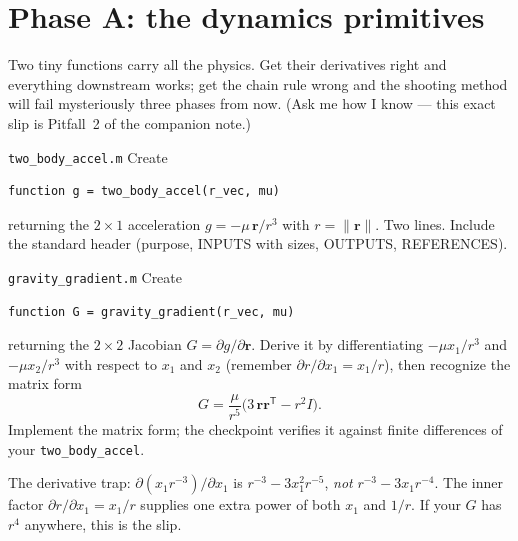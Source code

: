 \documentclass[11pt,letterpaper]{article}
\newcommand{\T}{^{\mathsf{T}}}
\newcommand{\rvec}{\mathbf{r}}
\begin{document}
\section{Phase A: the dynamics primitives}

Two tiny functions carry all the physics. Get their derivatives right and
everything downstream works; get the chain rule wrong and the shooting method
will fail mysteriously three phases from now. (Ask me how I know --- this
exact slip is Pitfall~2 of the companion note.)

\begin{exercise}{\texttt{two\_body\_accel.m}}
Create
\begin{verbatim}
function g = two_body_accel(r_vec, mu)
\end{verbatim}
returning the $2\times 1$ acceleration $g = -\mu\,\rvec/r^3$ with
$r = \|\rvec\|$. Two lines. Include the standard header (purpose, INPUTS
with sizes, OUTPUTS, REFERENCES).
\end{exercise}

\begin{exercise}{\texttt{gravity\_gradient.m}}
Create
\begin{verbatim}
function G = gravity_gradient(r_vec, mu)
\end{verbatim}
returning the $2\times 2$ Jacobian $G = \partial g/\partial \rvec$. Derive it
by differentiating $-\mu x_1/r^3$ and $-\mu x_2/r^3$ with respect to $x_1$
and $x_2$ (remember $\partial r/\partial x_1 = x_1/r$), then recognize the
matrix form
\[
  G = \frac{\mu}{r^5}\bigl(3\,\rvec\rvec\T - r^2 I\bigr).
\]
Implement the matrix form; the checkpoint verifies it against finite
differences of your \texttt{two\_body\_accel}.
\end{exercise}

\begin{hint}
The derivative trap: $\partial(x_1 r^{-3})/\partial x_1$ is
$r^{-3} - 3x_1^2 r^{-5}$, \emph{not} $r^{-3} - 3x_1 r^{-4}$. The inner factor
$\partial r/\partial x_1 = x_1/r$ supplies one extra power of both $x_1$ and
$1/r$. If your $G$ has $r^4$ anywhere, this is the slip.
\end{hint}
\end{document}

